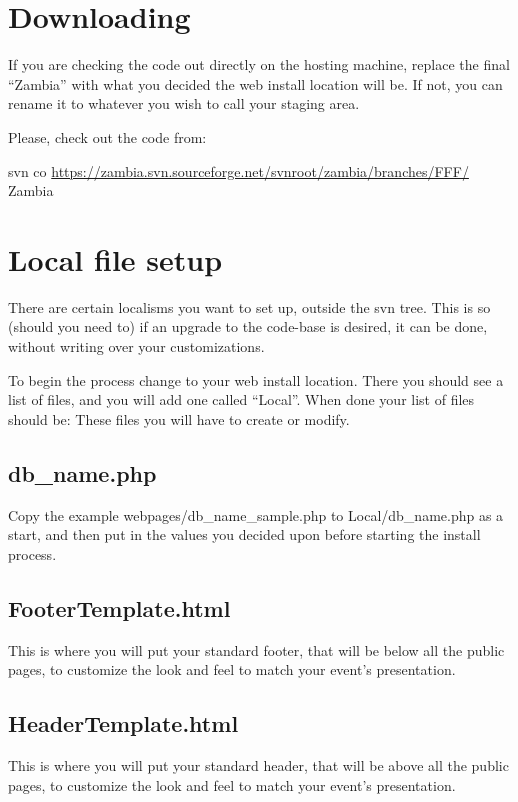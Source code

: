 \documentclass[tablesignature]{scrartcl}
\begin{document}
\section{Downloading}
\label{sec-2}

  If you are checking the code out directly on the hosting machine,
  replace the final ``Zambia'' with what you decided the web install
  location will be.  If not, you can rename it to whatever you wish to
  call your staging area.

  Please, check out the code from:

  svn co \href{https://zambia.svn.sourceforge.net/svnroot/zambia/branches/FFF/}{https://zambia.svn.sourceforge.net/svnroot/zambia/branches/FFF/} Zambia
\section{Local file setup}
\label{sec-3}

  There are certain localisms you want to set up, outside the svn
  tree. This is so (should you need to) if an upgrade to the code-base
  is desired, it can be done, without writing over your
  customizations.

  To begin the process change to your web install location.  There you
  should see a list of files, and you will add one called ``Local''.
  When done your list of files should be:
  These files you will have to create or modify.
\subsection{db\_{}name.php}
\label{sec-3_1}

     Copy the example webpages/db\_{}name\_{}sample.php to Local/db\_{}name.php
     as a start, and then put in the values you decided upon before
     starting the install process.
\subsection{FooterTemplate.html}
\label{sec-3_2}

     This is where you will put your standard footer, that will be
     below all the public pages, to customize the look and feel to
     match your event's presentation.
\subsection{HeaderTemplate.html}
\label{sec-3_3}

     This is where you will put your standard header, that will be
     above all the public pages, to customize the look and feel to
     match your event's presentation.
\end{document}
